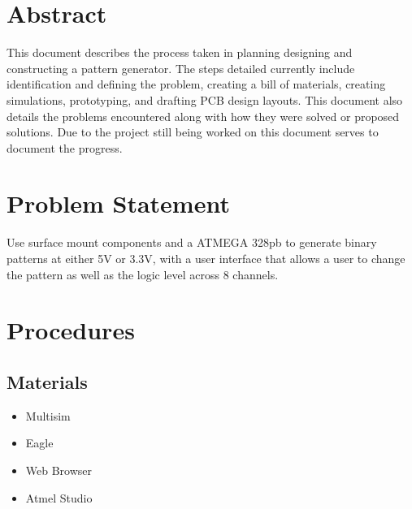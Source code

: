 \documentclass[12pt]{article}
\begin{document}
    
    \tableofcontents
    \listoffigures
    \newpage

    \section{Abstract}

    This document describes the process taken in planning designing and constructing a pattern generator. The steps detailed currently include identification and defining the problem, creating a bill of materials, creating simulations, prototyping, and drafting PCB design layouts. This document also details the problems encountered along with how they were solved or proposed solutions. Due to the project still being worked on this document serves to document the progress.

    \section{Problem Statement}

    Use surface mount components and a ATMEGA 328pb to generate binary patterns at either 5V or 3.3V, with a user interface that allows a user to change the pattern as well as the logic level across 8 channels. 

    \section{Procedures}
        \subsection{Materials}

            \begin{itemize}
                \item Multisim
                \item Eagle
                \item Web Browser
                \item Atmel Studio
            \end{itemize}
\end{document}
